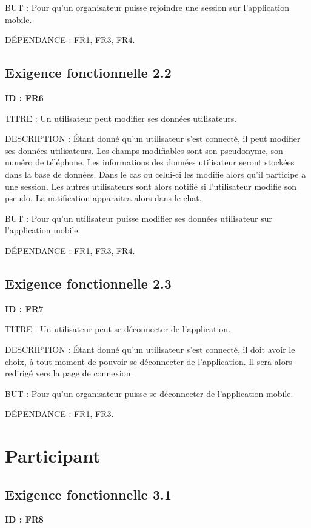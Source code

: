 \documentclass[titlepage, 12pt]{report}
\begin{document}
BUT : Pour qu'un organisateur puisse rejoindre une session sur l'application mobile.

DÉPENDANCE : FR1, FR3, FR4.

\subsection{Exigence fonctionnelle 2.2}

\textbf{ID : FR6}

TITRE : Un utilisateur peut modifier ses données utilisateurs.

DESCRIPTION : Étant donné qu'un utilisateur s'est connecté, il peut modifier ses données utilisateurs. Les champs modifiables sont son pseudonyme, son numéro de téléphone. Les informations des données utilisateur seront stockées dans la base de données.
Dans le cas ou celui-ci les modifie alors qu'il participe a une session. Les autres utilisateurs sont alors notifié si l'utilisateur modifie son pseudo. La notification apparaitra alors dans le chat.

BUT : Pour qu'un utilisateur puisse modifier ses données utilisateur sur l'application mobile.

DÉPENDANCE : FR1, FR3, FR4.

\subsection{Exigence fonctionnelle 2.3}

\textbf{ID : FR7}

TITRE : Un utilisateur peut se déconnecter de l'application.

DESCRIPTION : Étant donné qu'un utilisateur s'est connecté, il doit avoir le choix, à tout moment de pouvoir se déconnecter de l'application. Il sera alors redirigé vers la page de connexion.

BUT : Pour qu'un organisateur puisse se déconnecter de l'application mobile.

DÉPENDANCE : FR1, FR3.

\section{Participant}

\subsection{Exigence fonctionnelle 3.1}

\textbf{ID : FR8}
\end{document}
